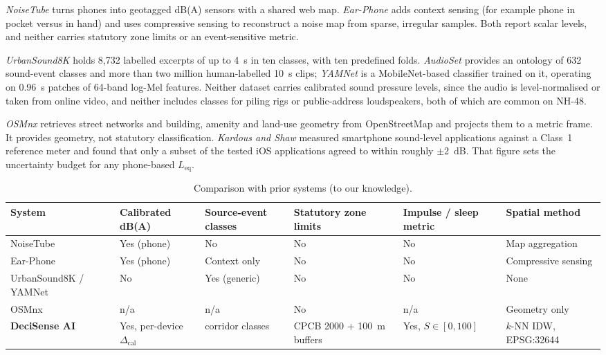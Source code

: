\documentclass[conference]{IEEEtran}
\newcommand{\Leq}{L_{\text{eq}}}
\begin{document}
\emph{NoiseTube} \cite{noisetube} turns phones into geotagged dB(A) sensors with a shared web map. \emph{Ear-Phone} \cite{earphone} adds context sensing (for example phone in pocket versus in hand) and uses compressive sensing to reconstruct a noise map from sparse, irregular samples. Both report scalar levels, and neither carries statutory zone limits or an event-sensitive metric.

\emph{UrbanSound8K} \cite{us8k} holds 8,732 labelled excerpts of up to 4~s in ten classes, with ten predefined folds. \emph{AudioSet} \cite{audioset} provides an ontology of 632 sound-event classes and more than two million human-labelled 10~s clips; \emph{YAMNet} \cite{yamnet} is a MobileNet-based classifier trained on it, operating on 0.96~s patches of 64-band log-Mel features. Neither dataset carries calibrated sound pressure levels, since the audio is level-normalised or taken from online video, and neither includes classes for piling rigs or public-address loudspeakers, both of which are common on NH-48.

\emph{OSMnx} \cite{osmnx} retrieves street networks and building, amenity and land-use geometry from OpenStreetMap and projects them to a metric frame. It provides geometry, not statutory classification. \emph{Kardous and Shaw} \cite{kardous} measured smartphone sound-level applications against a Class~1 reference meter and found that only a subset of the tested iOS applications agreed to within roughly $\pm$2~dB. That figure sets the uncertainty budget for any phone-based $\Leq$.

\begin{table}[!t]
\caption{Comparison with prior systems (to our knowledge).}
\label{tab:related}
\centering
\small
\renewcommand{\arraystretch}{1.15}
\begin{tabular}{@{}>{\raggedright\arraybackslash}p{}>{\raggedright\arraybackslash}p{}>{\raggedright\arraybackslash}p{}>{\raggedright\arraybackslash}p{}>{\raggedright\arraybackslash}p{}>{\raggedright\arraybackslash}p{}@{}}
\toprule
System & Calibrated dB(A) & Source-event classes & Statutory zone limits & Impulse / sleep metric & Spatial method \\
\midrule
NoiseTube \cite{noisetube} & Yes (phone) & No & No & No & Map aggregation \\
Ear-Phone \cite{earphone} & Yes (phone) & Context only & No & No & Compressive sensing \\
UrbanSound8K \cite{us8k} / YAMNet \cite{yamnet} & No & Yes (generic) & No & No & None \\
OSMnx \cite{osmnx} & n/a & n/a & No & n/a & Geometry only \\
\textbf{DeciSense AI} & Yes, per-device $\Delta_{\text{cal}}$ & 5 corridor classes & CPCB 2000 + 100~m buffers & Yes, $S\in[0,100]$ & $k$-NN IDW, EPSG:32644 \\
\bottomrule
\end{tabular}
\end{table}
\end{document}
